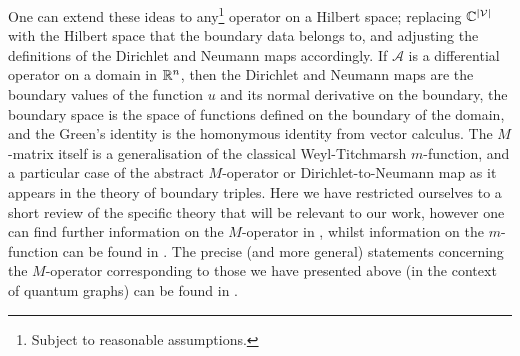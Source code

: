 One can extend these ideas to any\footnote{Subject to reasonable assumptions.} operator on a Hilbert space; replacing $\mathbb{C}^{\left\lvert \mathcal{V} \right\rvert}$ with the Hilbert space that the boundary data belongs to, and adjusting the definitions of the Dirichlet and Neumann maps accordingly.
If $\mathcal{A}$ is a differential operator on a domain in $\mathbb{R}^n$, then the Dirichlet and Neumann maps are the boundary values of the function $u$ and its normal derivative on the boundary, the boundary space is the space of functions defined on the boundary of the domain, and the Green's identity is the homonymous identity from vector calculus.
The $M$-matrix itself is a generalisation of the classical Weyl-Titchmarsh $m$-function, and a particular case of the abstract $M$-operator or Dirichlet-to-Neumann map as it appears in the theory of boundary triples.
Here we have restricted ourselves to a short review of the specific theory that will be relevant to our work, however one can find further information on the $M$-operator in \cite{kochubei1975extensions, kochubei1980characteristic, gorbachuk1991boundary, brown2008boundary, brown2020functional, cherednichenko2020scattering, cherednichenko2018functional}, whilst information on the $m$-function can be found in \cite{titchmarsh1962eigenfunction, atkinson1964discrete}.
The precise (and more general) statements concerning the $M$-operator corresponding to those we have presented above (in the context of quantum graphs) can be found in \cite{derkach1991generalized, derkach2014boundary}.

